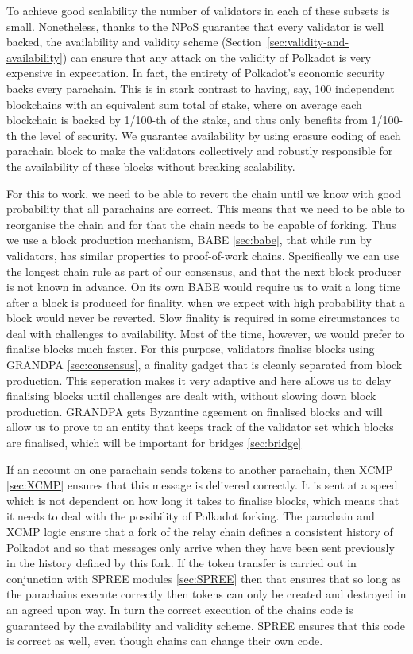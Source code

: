 To achieve good scalability the number of validators in each of these subsets is small. Nonetheless, thanks to the NPoS guarantee that every validator is well backed, the availability and validity scheme (Section~\ref{sec:validity-and-availability}) can ensure that any attack on the validity of Polkadot is very expensive in expectation. In fact, the entirety of Polkadot's economic security backs every parachain. This is in stark contrast to having, say, 100 independent blockchains with an equivalent sum total of stake, where on average each blockchain is backed by 1/100-th of the stake, and thus only benefits from 1/100-th the level of security. We guarantee availability by using erasure coding of each parachain block to make the validators collectively and robustly responsible for the availability of these blocks without breaking scalability. 

For this to work, we need to be able to revert the chain until we know with good probability that all parachains are correct. This means that we need to be able to reorganise the chain and for that the chain needs to be capable of forking. Thus we use a block production mechanism, BABE \ref{sec:babe}, that while run by validators, has similar properties to proof-of-work chains. Specifically we can use the longest chain rule as part of our consensus, and that the next block producer is not known in advance. On its own BABE would require us to wait a long time after a block is produced for finality, when we expect with high probability that a block would never be reverted. Slow finality is required in some circumstances to deal with challenges to availability. Most of the time, however, we would prefer to finalise blocks much faster.  For this purpose, validators finalise blocks using GRANDPA \ref{sec:consensus}, a finality gadget that is cleanly separated from block production. This seperation makes it very adaptive and here allows us to delay finalising blocks until challenges are dealt with, without slowing down block production. GRANDPA gets Byzantine ageement on finalised blocks and will allow us to prove to an entity that keeps track of the validator set which blocks are finalised, which will be important for bridges \ref{sec:bridge}

If an account on one parachain sends tokens to another parachain, then XCMP \ref{sec:XCMP} ensures that this message is delivered correctly. It is sent at a speed which is not dependent on how long it takes to finalise blocks, which means that it needs to deal with the possibility of Polkadot forking. The parachain and XCMP logic ensure that a fork of the relay chain defines a consistent history of Polkadot and so that messages only arrive when they have been sent previously in the history defined by this fork. If the token transfer is carried out in conjunction with SPREE modules \ref{sec:SPREE} then that ensures that so long as the parachains execute correctly then tokens can only be created and destroyed in an agreed upon way. In turn the correct execution of the chains code is guaranteed by the availability and validity scheme. SPREE ensures that this code is correct as well, even though chains can change their own code.

